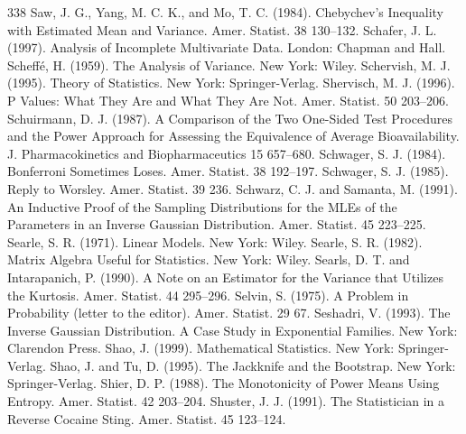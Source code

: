 \begin{thebibliography}{338}
\label{bib:source273} Saw, J. G., Yang, M. C. K., and Mo, T. C. (1984). Chebychev’s Inequality with Estimated Mean and Variance. Amer. Statist. 38 130–132.
\label{bib:source274} Schafer, J. L. (1997). Analysis of Incomplete Multivariate Data. London: Chapman and Hall.
\label{bib:source275} Scheffé, H. (1959). The Analysis of Variance. New York: Wiley.
\label{bib:source276} Schervish, M. J. (1995). Theory of Statistics. New York: Springer-Verlag.
\label{bib:source277} Shervisch, M. J. (1996). P Values: What They Are and What They Are Not. Amer. Statist. 50 203–206.
\label{bib:source278} Schuirmann, D. J. (1987). A Comparison of the Two One-Sided Test Procedures and the Power Approach for Assessing the Equivalence of Average Bioavailability. J. Pharmacokinetics and Biopharmaceutics 15 657–680.
\label{bib:source279} Schwager, S. J. (1984). Bonferroni Sometimes Loses. Amer. Statist. 38 192–197.
\label{bib:source280} Schwager, S. J. (1985). Reply to Worsley. Amer. Statist. 39 236.
\label{bib:source281} Schwarz, C. J. and Samanta, M. (1991). An Inductive Proof of the Sampling Distributions for the MLEs of the Parameters in an Inverse Gaussian Distribution. Amer. Statist. 45 223–225.
\label{bib:source282} Searle, S. R. (1971). Linear Models. New York: Wiley.
\label{bib:source283} Searle, S. R. (1982). Matrix Algebra Useful for Statistics. New York: Wiley.
\label{bib:source284} Searls, D. T. and Intarapanich, P. (1990). A Note on an Estimator for the Variance that Utilizes the Kurtosis. Amer. Statist. 44 295–296.
\label{bib:source285} Selvin, S. (1975). A Problem in Probability (letter to the editor). Amer. Statist. 29 67.
\label{bib:source286} Seshadri, V. (1993). The Inverse Gaussian Distribution. A Case Study in Exponential Families. New York: Clarendon Press.
\label{bib:source287} Shao, J. (1999). Mathematical Statistics. New York: Springer-Verlag.
\label{bib:source288} Shao, J. and Tu, D. (1995). The Jackknife and the Bootstrap. New York: Springer-Verlag.
\label{bib:source289} Shier, D. P. (1988). The Monotonicity of Power Means Using Entropy. Amer. Statist. 42 203–204.
\label{bib:source290} Shuster, J. J. (1991). The Statistician in a Reverse Cocaine Sting. Amer. Statist. 45 123–124.

\end{thebibliography}
